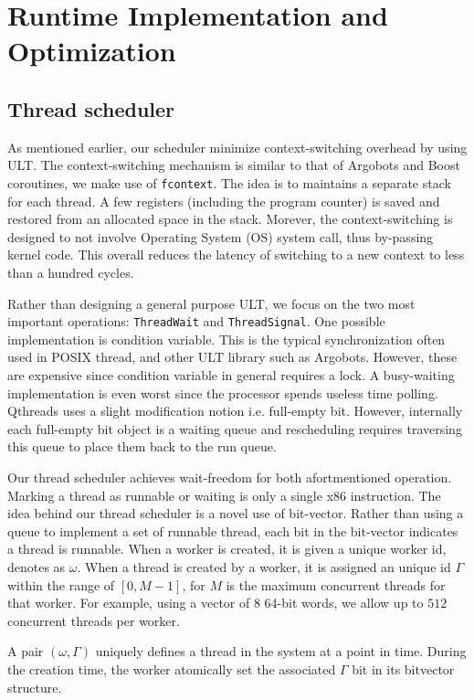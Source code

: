 \documentclass{sig-alternate-05-2015}
\begin{document}
\section{Runtime Implementation and Optimization}
\label{sec:impl}
\subsection{Thread scheduler}
As mentioned earlier, our scheduler minimize context-switching overhead by
using ULT. The context-switching mechanism is similar to that of Argobots and
Boost coroutines, we make use of \texttt{fcontext}. The idea is to maintains a
separate stack for each thread. A few registers (including the program counter)
is saved and restored from an allocated space in the stack. Morever, the
context-switching is designed to not involve Operating System (OS) system call,
thus by-passing kernel code. This overall reduces the latency of switching to a
new context to less than a hundred cycles.

Rather than designing a general purpose ULT, we focus on the two most important
operations: \texttt{ThreadWait} and \texttt{ThreadSignal}. One possible
implementation is condition variable. This is the typical synchronization often
used in POSIX thread, and other ULT library such as Argobots.  However, these
are expensive since condition variable in general requires a lock. A
busy-waiting implementation is even worst since the processor spends useless
time polling. Qthreads uses a slight modification notion i.e.  full-empty bit.
However, internally each full-empty bit object is a waiting queue and
rescheduling requires traversing this queue to place them back to the run
queue.

Our thread scheduler achieves wait-freedom for both afortmentioned operation.
Marking a thread as runnable or waiting is only a single x86 instruction. The
idea behind our thread scheduler is a novel use of bit-vector. Rather than
using a queue to implement a set of runnable thread, each bit in the bit-vector
indicates a thread is runnable. When a worker is created, it is given a unique
worker id, denotes as $\omega$.  When a thread is created by a worker, it is
assigned an unique id $\Gamma$ within the range of $[0,M-1]$, for $M$ is the
maximum concurrent threads for that worker.  For example, using a vector of $8$
64-bit words, we allow up to $512$ concurrent threads per worker.

A pair $(\omega, \Gamma)$ uniquely defines a thread in the system at a point in
time. During the creation time, the worker atomically set the
associated $\Gamma$ bit in its bitvector structure.
\end{document}
